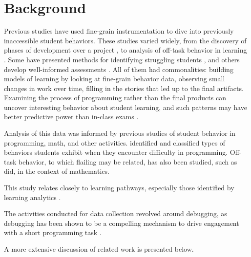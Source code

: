 \chapter{Background}
\label{chap:background}

Previous studies have used fine-grain instrumentation to dive into previously inaccessible student behaviors. These studies varied widely, from the discovery of phases of development over a project \citep{berland-2013, martin2013nanogenetic}, to analysis of off-task behavior in learning \citep{baker2004off}. Some have presented methods for identifying struggling students \cite{piech-2012}, and others develop well-informed assessments \citep{werner2012fairy}. All of them had commonalities: building models of learning by looking at fine-grain behavior data, observing small changes in work over time, filling in the stories that led up to the final artifacts. Examining the process of programming rather than the final products can uncover interesting behavior about student learning, and such patterns may have better predictive power than in-class exams \citep{blikstein2014}.

Analysis of this data was informed by previous studies of student behavior in programming, math, and other activities. \cite{perkins-1986} identified and classified types of behaviors students exhibit when they encounter difficulty in programming. Off-task behavior, to which flailing may be related, has also been studied, such as \cite{baker2004off} did, in the context of mathematics. 

This study relates closely to learning pathways, especially those identified by learning analytics \citep{martin2013nanogenetic}. 

The activities conducted for data collection revolved around debugging, as debugging has been shown to be a compelling mechanism to drive engagement with a short programming task \citep{webb2010troubleshooting}.

A more extensive discussion of related work is presented below.




